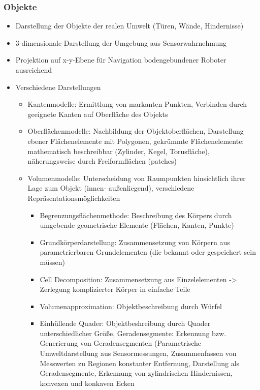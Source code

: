 \documentclass[paper=a4, fontsize=11pt]{scrartcl} %
\numberwithin{equation}{section} %
\numberwithin{figure}{section} %
\numberwithin{table}{section} %
\begin{document}
\subsubsection{Objekte}
\begin{itemize}
\item Darstellung der Objekte der realen Umwelt (Türen, Wände, Hindernisse)
\item 3-dimensionale Darstellung der Umgebung aus Sensorwahrnehmung
\item Projektion auf x-y-Ebene für Navigation bodengebundener Roboter ausreichend
\item Verschiedene Darstellungen
\begin{itemize}
\item Kantenmodelle: Ermittlung von markanten Punkten, Verbinden durch geeignete Kanten auf Oberfläche des Objekts
\item Oberflächenmodelle: Nachbildung der Objektoberflächen, Darstellung ebener Flächenelemente mit Polygonen, gekrümmte Flächenelemente: mathematisch beschreibbar (Zylinder, Kegel, Torusfläche), näherungsweise durch Freiformflächen (patches)
\item Volumenmodelle: Unterscheidung von Raumpunkten hinsichtlich ihrer Lage zum Objekt (innen- außenliegend), verschiedene Repräsentationsmöglichkeiten
\begin{itemize}
\item Begrenzungsflächenmethode: Beschreibung des Körpers durch umgebende geometrische Elemente (Flächen, Kanten, Punkte)
\item Grundkörperdarstellung: Zusammensetzung von Körpern aus parametrierbaren Grundelementen (die bekannt oder gespeichert sein müssen)
\item Cell Decomposition: Zusammensetzung aus Einzelelementen -> Zerlegung komplizierter Körper in einfache Teile
\item Volumenapproximation: Objektbeschreibung durch Würfel
\item Einhüllende Quader: Objektbeshreibung durch Quader unterschiedlicher Größe, Geradensegmente: Erkennung bzw. Generierung von Geradensegmenten (Parametrische Umweltdarstellung aus Sensormessungen, Zusammenfassen von Messwerten zu Regionen konstanter Entfernung, Darstellung als Geradensegmente, Erkennung von zylindrischen Hindernissen, konvexen und konkaven Ecken
\end{itemize}
\end{itemize}
\end{itemize}
\end{document}
